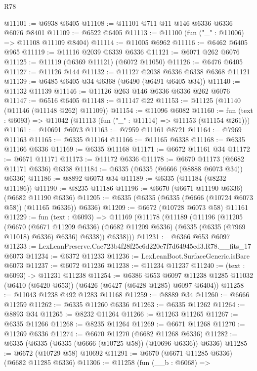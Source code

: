 \begin{lexlean}{R78}
\begin{coremodule}
@11101 := @6938 @6405
@11108 := @11101 @711 @11 @146 @6336 @6336 @6076 @8401
@11109 := @6522 @6405
@11113 := @11100 (fun ("_" : @11006) => @11108 @11109 @8404)
@11114 := @11005 @6962
@11116 := @6462 @6405 @965
@11119 := @11116 @2039 @6339 @6336
@11121 := @6071 @262 @6076
@11125 := @11119 (@6369 @11121) (@6072 @11050)
@11126 := @6476 @6405
@11127 := @11126 @144
@11132 := @11127 @2038 @6336 @6338 @6368 @11121
@11139 := @6485 @6405 @34 @6368 (@6490 (@6491 @6405 @34))
@11140 := @11132 @11139
@11146 := @11126 @263 @146 @6336 @6336 @262 @6076
@11147 := @6516 @6405
@11148 := @11147 @22
@11153 := @11125 (@11140 (@11146 (@11148 @262) @11109))
@11154 := @11096 @6082
@11160 := fun (text : @6093) => @11042 (@11113 (fun ("_" : @11114) => @11153 (@11154 @261)))
@11161 := @10691 @6073
@11163 := @7959 @11161 @8721
@11164 := @7969 @11163
@11165 := @6335 @11164
@11166 := @11165 @6338
@11168 := @6335 @11166 @6336
@11169 := @6335 @11168
@11171 := @6672 @11161 @34
@11172 := @6671 @11171
@11173 := @11172 @6336
@11178 := @6670 @11173 (@6682 @11171 @6336) @6338
@11184 := @6335 (@6335 (@6666 (@8888 @6073 @34)) @6336)
@11186 := @8892 @6073 @34
@11189 := @6335 (@11184 (@8232 @11186))
@11190 := @8235 @11186
@11196 := @6670 (@6671 @11190 @6336) (@6682 @11190 @6336)
@11205 := @6335 (@6335 (@6335 (@6666 (@10724 @6073 @58)) (@11165 @6336)) @6336)
@11209 := @6672 (@10728 @6073 @58) @11161
@11229 := fun (text : @6093) =>
  @11169
    (@11178
      (@11189
        (@11196
          (@11205
            (@6670
              (@6671 @11209 @6336)
              (@6682 @11209 @6336)
              (@6335 (@6335 (@7969 @11018) @6336) @6336)
              @6338))
          @6338)))
@11231 := @6366 @653 @6097
@11233 := LexLeanPreserve.Cae723b4f28f25c6d220e7f7d64945ed3.R78.__fits_17 @6073
@11234 := @6372 @11233
@11236 := LexLeanBoot.SurfaceGeneric.isBare @6073
@11237 := @6072 @11236
@11238 := @11234 @11237
@11240 := (text : @6093) -> @11231 @11238
@11254 := @6386
    @653
    @6097
    @11238
    @1285
    @11032
    (@6410 (@6420 @653))
    (@6426 (@6427 (@6428 @1285) @6097 @6404))
@11258 := @11043 @1238 @492 @1283 @11168
@11259 := @8889 @34
@11260 := @6666 @11259
@11262 := @6335 @11260 @6336
@11263 := @6335 @11262
@11264 := @8893 @34
@11265 := @8232 @11264
@11266 := @11263 @11265
@11267 := @6335 @11266
@11268 := @8235 @11264
@11269 := @6671 @11268
@11270 := @11269 @6336
@11274 := @6670 @11270 (@6682 @11268 @6336)
@11282 := @6335 (@6335 (@6335 (@6666 (@10725 @58)) (@10696 @6336)) @6336)
@11285 := @6672 (@10729 @58) @10692
@11291 := @6670 (@6671 @11285 @6336) (@6682 @11285 @6336)
@11306 := @11258
    (fun (__b : @6068) =>

\end{coremodule}
\end{lexlean}
